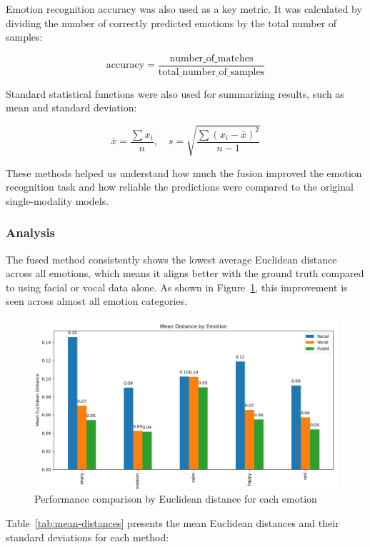 Emotion recognition accuracy was also used as a key metric. It was calculated by dividing the number of correctly predicted emotions by the total number of samples:

\[
\text{accuracy} = \frac{\text{number\_of\_matches}}{\text{total\_number\_of\_samples}}
\]

Standard statistical functions were also used for summarizing results, such as mean and standard deviation:

\[
\bar{x} = \frac{\sum x_i}{n}, \quad s = \sqrt{\frac{\sum(x_i - \bar{x})^2}{n - 1}}
\]

These methods helped us understand how much the fusion improved the emotion recognition task and how reliable the predictions were compared to the original single-modality models.


\subsubsection*{Analysis}
The fused method consistently shows the lowest average Euclidean distance across all emotions, which means it aligns better with the ground truth compared to using facial or vocal data alone. As shown in Figure~\ref{fig:fusion-performance}, this improvement is seen across almost all emotion categories.  

\begin{figure}[H] 
    \centering
    \includegraphics[width=1.1\textwidth]{img/chapter_04/fusion/emotion_performance_with_values}
    \caption{Performance comparison by Euclidean distance for each emotion}
    \label{fig:fusion-performance}
\end{figure}
 
Table~\ref{tab:mean-distances} presents the mean Euclidean distances and their standard deviations for each method:

